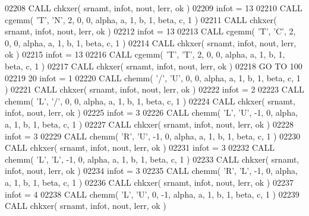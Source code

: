 \begin{DoxyCode}
02208       \textcolor{keyword}{CALL }chkxer( srnamt, infot, nout, lerr, ok )
02209       infot = 13
02210       \textcolor{keyword}{CALL }cgemm( \textcolor{stringliteral}{'T'}, \textcolor{stringliteral}{'N'}, 2, 0, 0, alpha, a, 1, b, 1, beta, c, 1 )
02211       \textcolor{keyword}{CALL }chkxer( srnamt, infot, nout, lerr, ok )
02212       infot = 13
02213       \textcolor{keyword}{CALL }cgemm( \textcolor{stringliteral}{'T'}, \textcolor{stringliteral}{'C'}, 2, 0, 0, alpha, a, 1, b, 1, beta, c, 1 )
02214       \textcolor{keyword}{CALL }chkxer( srnamt, infot, nout, lerr, ok )
02215       infot = 13
02216       \textcolor{keyword}{CALL }cgemm( \textcolor{stringliteral}{'T'}, \textcolor{stringliteral}{'T'}, 2, 0, 0, alpha, a, 1, b, 1, beta, c, 1 )
02217       \textcolor{keyword}{CALL }chkxer( srnamt, infot, nout, lerr, ok )
02218       \textcolor{keywordflow}{GO TO} 100
02219    20 infot = 1
02220       \textcolor{keyword}{CALL }chemm( \textcolor{stringliteral}{'/'}, \textcolor{stringliteral}{'U'}, 0, 0, alpha, a, 1, b, 1, beta, c, 1 )
02221       \textcolor{keyword}{CALL }chkxer( srnamt, infot, nout, lerr, ok )
02222       infot = 2
02223       \textcolor{keyword}{CALL }chemm( \textcolor{stringliteral}{'L'}, \textcolor{stringliteral}{'/'}, 0, 0, alpha, a, 1, b, 1, beta, c, 1 )
02224       \textcolor{keyword}{CALL }chkxer( srnamt, infot, nout, lerr, ok )
02225       infot = 3
02226       \textcolor{keyword}{CALL }chemm( \textcolor{stringliteral}{'L'}, \textcolor{stringliteral}{'U'}, -1, 0, alpha, a, 1, b, 1, beta, c, 1 )
02227       \textcolor{keyword}{CALL }chkxer( srnamt, infot, nout, lerr, ok )
02228       infot = 3
02229       \textcolor{keyword}{CALL }chemm( \textcolor{stringliteral}{'R'}, \textcolor{stringliteral}{'U'}, -1, 0, alpha, a, 1, b, 1, beta, c, 1 )
02230       \textcolor{keyword}{CALL }chkxer( srnamt, infot, nout, lerr, ok )
02231       infot = 3
02232       \textcolor{keyword}{CALL }chemm( \textcolor{stringliteral}{'L'}, \textcolor{stringliteral}{'L'}, -1, 0, alpha, a, 1, b, 1, beta, c, 1 )
02233       \textcolor{keyword}{CALL }chkxer( srnamt, infot, nout, lerr, ok )
02234       infot = 3
02235       \textcolor{keyword}{CALL }chemm( \textcolor{stringliteral}{'R'}, \textcolor{stringliteral}{'L'}, -1, 0, alpha, a, 1, b, 1, beta, c, 1 )
02236       \textcolor{keyword}{CALL }chkxer( srnamt, infot, nout, lerr, ok )
02237       infot = 4
02238       \textcolor{keyword}{CALL }chemm( \textcolor{stringliteral}{'L'}, \textcolor{stringliteral}{'U'}, 0, -1, alpha, a, 1, b, 1, beta, c, 1 )
02239       \textcolor{keyword}{CALL }chkxer( srnamt, infot, nout, lerr, ok )

\end{DoxyCode}
